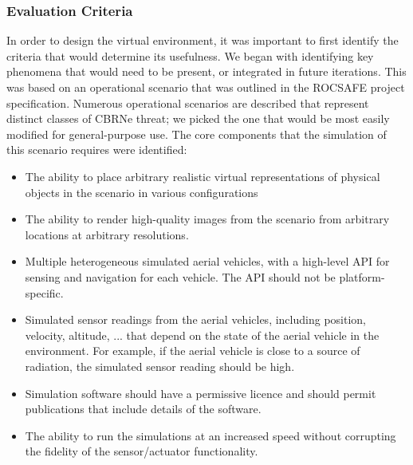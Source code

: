 
\subsubsection{Evaluation Criteria}
In order to design the virtual environment, it was important to first identify the criteria that would determine its usefulness. We began with identifying key phenomena that would need to be present, or integrated in future iterations. This was based on an operational scenario that was outlined in the ROCSAFE project specification\cite{rocsafeNUIG}. Numerous operational scenarios are described that represent distinct classes of CBRNe threat; we picked the one that would be most easily modified for general-purpose use.
The core components that the simulation of this scenario requires were identified: 
\begin{itemize}
    \item The ability to place arbitrary realistic virtual representations of physical objects in the scenario in various configurations
    \item The ability to render high-quality images from the scenario from arbitrary locations at arbitrary resolutions.
    \item Multiple heterogeneous simulated aerial vehicles, with a high-level API for sensing and navigation for each vehicle. The API should not be platform-specific.
    \item Simulated sensor readings from the aerial vehicles, including position, velocity, altitude, ... that depend on the state of the aerial vehicle in the environment. For example, if the aerial vehicle is close to a source of radiation, the simulated sensor reading should be high.
    \item Simulation software should have a permissive licence and should permit publications that include details of the software.
    \item The ability to run the simulations at an increased speed without corrupting the fidelity of the sensor/actuator functionality.
\end{itemize}

